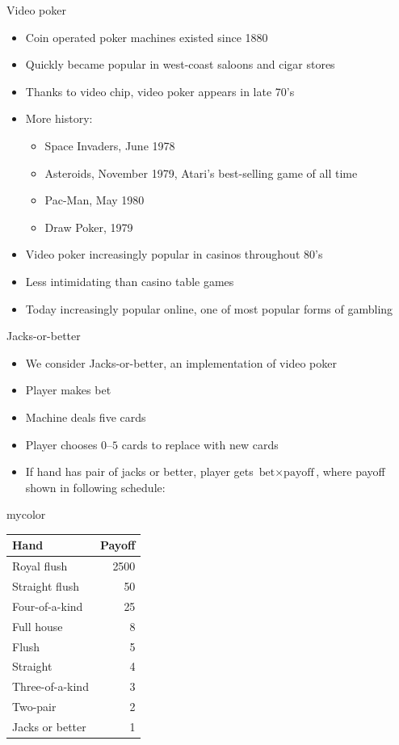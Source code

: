 \documentclass[handout,xcolor=dvipsnames]{beamer}
\theoremstyle{definition}
\begin{document}
\begin{frame}{Video poker}
\begin{itemize}
\item Coin operated poker machines existed since 1880
\item Quickly became popular in west-coast
saloons and cigar stores
\item Thanks to video chip, video poker appears in late 70's
\item More history:
\begin{itemize}
\item \alert{Space Invaders}, June 1978
\item \alert{Asteroids}, November 1979, Atari's best-selling game of all time
\item \alert{Pac-Man}, May 1980
\item \alert{Draw Poker}, 1979
\end{itemize}
\item Video poker increasingly popular in casinos
throughout 80's
\item Less intimidating than casino table games
\item Today increasingly popular online, one of most popular
forms of gambling
\end{itemize}
\end{frame}

\begin{frame}{Jacks-or-better}
\begin{multicols}{2}
\begin{itemize}
\item We consider \alert{Jacks-or-better},
an implementation of video poker
\item Player makes bet
\item Machine deals five cards
\item Player chooses $0$--$5$ cards to replace with new cards
\item If hand has pair of jacks or better,
player gets $\text{bet}\times\text{payoff}$,
where payoff shown in
following schedule:
\end{itemize}
\begin{beamercolorbox}{mycolor}
\begin{tabular}{lr}
Hand&Payoff\\\hline
Royal flush&2500\\
Straight flush&50\\
Four-of-a-kind&25\\
Full house&8\\
Flush&5\\
Straight&4\\
Three-of-a-kind&3\\
Two-pair&2\\
Jacks or better&1
\end{tabular}
\end{beamercolorbox}
\end{multicols}
\end{frame}
\end{document}
